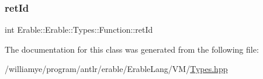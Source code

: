 \mbox{\label{class_erable_1_1_erable_1_1_types_1_1_function_a60a53fd4e88e504fbae5ba2a8f19f996}} 
\subsubsection{\texorpdfstring{retId}{retId}}
{\footnotesize\ttfamily int Erable\+::\+Erable\+::\+Types\+::\+Function\+::ret\+Id\hspace{0.3cm}{\ttfamily [private]}}



The documentation for this class was generated from the following file\+:\begin{DoxyCompactItemize}
\item 
/williamye/program/antlr/erable/\+Erable\+Lang/\+V\+M/\mbox{\hyperlink{_types_8hpp}{Types.\+hpp}}\end{DoxyCompactItemize}
